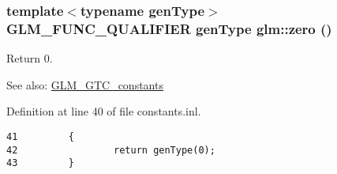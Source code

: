 \hypertarget{group__gtc__constants_g888d199297a924864bc2235f5133c30f}{
\subsubsection[zero]{\setlength{\rightskip}{0pt plus 5cm}template$<$typename genType$>$ GLM\_\-FUNC\_\-QUALIFIER genType glm::zero ()}}
\label{group__gtc__constants_g888d199297a924864bc2235f5133c30f}


Return 0. \begin{Desc}
\item[See also:]\hyperlink{group__gtc__constants}{GLM\_\-GTC\_\-constants} \end{Desc}


Definition at line 40 of file constants.inl.

\begin{Code}\begin{verbatim}41         {
42                 return genType(0);
43         }
\end{verbatim}
\end{Code}


